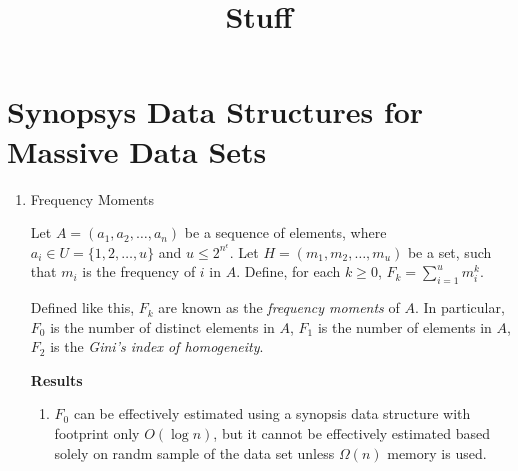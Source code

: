 \documentclass{article}
\title{Stuff}
\begin{document}
\maketitle

\section{Synopsys Data Structures for Massive Data Sets}

\begin{enumerate}

\item Frequency Moments

Let $A=(a_1, a_2,\ldots, a_n)$ be a sequence of elements, where
$a_i \in U = \{1, 2, \ldots, u\}$ and $u \leq 2^{n^\epsilon}$. Let $H
= (m_1, m_2,\ldots, m_u)$ be a set, such that $m_i$ is the frequency
of $i$ in $A$. Define, for each $k \geq 0$, $F_k =
\sum_{i=1}^{u}m_{i}^{k}$.

Defined like this, $F_k$ are known as the \emph{frequency moments}
of $A$. In particular, $F_0$ is the number of distinct elements in
$A$, $F_1$ is the number of elements in $A$, $F_2$ is the \emph{Gini's
  index of homogeneity}.

{\bf Results}\\
\begin{enumerate}
\item $F_0$ can be effectively estimated using a synopsis data
  structure with footprint only $O(\log n)$, but it cannot be effectively
  estimated based solely on randm sample of the data set unless
  $\Omega(n)$ memory is used.
\end{enumerate}



\end{enumerate}
 
\end{document}
